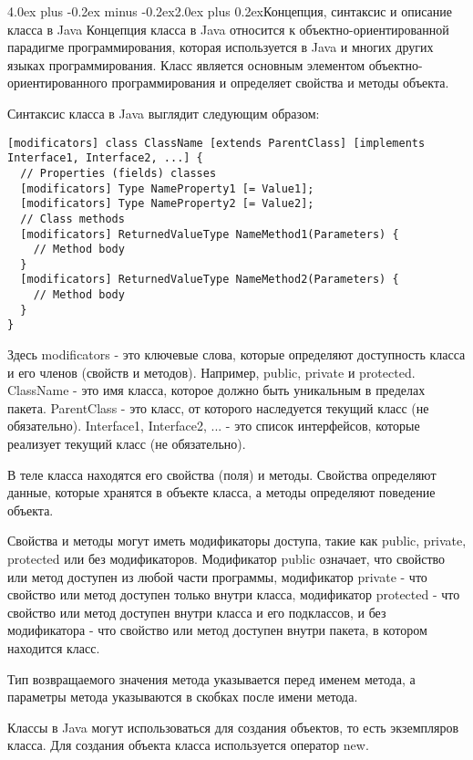 \documentclass[12pt, a4paper]{book}%
\makeatletter
\renewcommand{\section}{\@startsection{section}{1}{1pt}%
{4.0ex plus -0.2ex minus -0.2ex}{2.0ex plus 0.2ex}{\centering\bf}}%
\makeatother
\begin{document}
{\section{Концепция, синтаксис и описание класса в Java}
Концепция класса в Java относится к объектно-ориентированной парадигме программирования, которая используется в Java и многих других языках программирования. Класс является основным элементом объектно-ориентированного программирования и определяет свойства и методы объекта.

Синтаксис класса в Java выглядит следующим образом:

\begin{lstlisting}
[modificators] class ClassName [extends ParentClass] [implements Interface1, Interface2, ...] {
  // Properties (fields) classes
  [modificators] Type NameProperty1 [= Value1];
  [modificators] Type NameProperty2 [= Value2];
  // Class methods
  [modificators] ReturnedValueType NameMethod1(Parameters) {
    // Method body
  }
  [modificators] ReturnedValueType NameMethod2(Parameters) {
    // Method body
  }
}
\end{lstlisting}

Здесь modificators - это ключевые слова, которые определяют доступность класса и его членов (свойств и методов). Например, public, private и protected. ClassName - это имя класса, которое должно быть уникальным в пределах пакета. ParentClass - это класс, от которого наследуется текущий класс (не обязательно). Interface1, Interface2, ... - это список интерфейсов, которые реализует текущий класс (не обязательно).

В теле класса находятся его свойства (поля) и методы. Свойства определяют данные, которые хранятся в объекте класса, а методы определяют поведение объекта.

Свойства и методы могут иметь модификаторы доступа, такие как public, private, protected или без модификаторов. Модификатор public означает, что свойство или метод доступен из любой части программы, модификатор private - что свойство или метод доступен только внутри класса, модификатор protected - что свойство или метод доступен внутри класса и его подклассов, и без модификатора - что свойство или метод доступен внутри пакета, в котором находится класс.

Тип возвращаемого значения метода указывается перед именем метода, а параметры метода указываются в скобках после имени метода.

Классы в Java могут использоваться для создания объектов, то есть экземпляров класса. Для создания объекта класса используется оператор new. 

}
\end{document}
